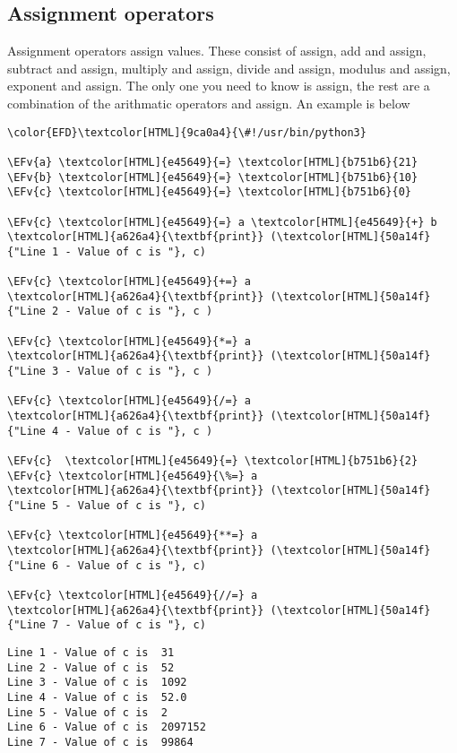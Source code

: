 \documentclass{scrartcl}
\newcommand{\EFv}[1]{\textcolor{EFv}{#1}} %
\begin{document}
\subsection{Assignment operators}
\label{sec:orgcc2aa28}
Assignment operators assign values. These consist of assign, add and assign,
subtract and assign, multiply and assign, divide and assign, modulus and assign,
exponent and assign. The only one you need to know is assign, the rest are a
combination of the arithmatic operators and assign. An example is below
\begin{Code}
\begin{Verbatim}[]
\color{EFD}\textcolor[HTML]{9ca0a4}{\#!/usr/bin/python3}

\EFv{a} \textcolor[HTML]{e45649}{=} \textcolor[HTML]{b751b6}{21}
\EFv{b} \textcolor[HTML]{e45649}{=} \textcolor[HTML]{b751b6}{10}
\EFv{c} \textcolor[HTML]{e45649}{=} \textcolor[HTML]{b751b6}{0}

\EFv{c} \textcolor[HTML]{e45649}{=} a \textcolor[HTML]{e45649}{+} b
\textcolor[HTML]{a626a4}{\textbf{print}} (\textcolor[HTML]{50a14f}{"Line 1 - Value of c is "}, c)

\EFv{c} \textcolor[HTML]{e45649}{+=} a
\textcolor[HTML]{a626a4}{\textbf{print}} (\textcolor[HTML]{50a14f}{"Line 2 - Value of c is "}, c )

\EFv{c} \textcolor[HTML]{e45649}{*=} a
\textcolor[HTML]{a626a4}{\textbf{print}} (\textcolor[HTML]{50a14f}{"Line 3 - Value of c is "}, c )

\EFv{c} \textcolor[HTML]{e45649}{/=} a
\textcolor[HTML]{a626a4}{\textbf{print}} (\textcolor[HTML]{50a14f}{"Line 4 - Value of c is "}, c )

\EFv{c}  \textcolor[HTML]{e45649}{=} \textcolor[HTML]{b751b6}{2}
\EFv{c} \textcolor[HTML]{e45649}{\%=} a
\textcolor[HTML]{a626a4}{\textbf{print}} (\textcolor[HTML]{50a14f}{"Line 5 - Value of c is "}, c)

\EFv{c} \textcolor[HTML]{e45649}{**=} a
\textcolor[HTML]{a626a4}{\textbf{print}} (\textcolor[HTML]{50a14f}{"Line 6 - Value of c is "}, c)

\EFv{c} \textcolor[HTML]{e45649}{//=} a
\textcolor[HTML]{a626a4}{\textbf{print}} (\textcolor[HTML]{50a14f}{"Line 7 - Value of c is "}, c)
\end{Verbatim}
\end{Code}

\begin{verbatim}
Line 1 - Value of c is  31
Line 2 - Value of c is  52
Line 3 - Value of c is  1092
Line 4 - Value of c is  52.0
Line 5 - Value of c is  2
Line 6 - Value of c is  2097152
Line 7 - Value of c is  99864
\end{verbatim}
\end{document}
